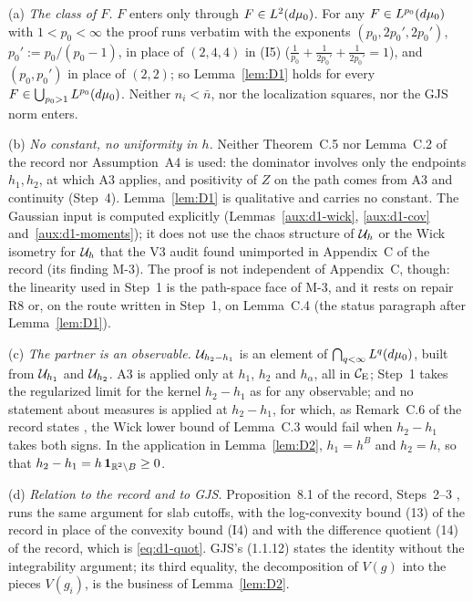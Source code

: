 \begin{auxrem}\label{aux:d1-uses}
(a) \emph{The class of $F$.} $F$ enters only through $F\in L^2(d\mu_0)$. For any
$F\in L^{p_0}(d\mu_0)$ with $1<p_0<\infty$ the proof runs verbatim with the exponents
$(p_0,2p_0',2p_0')$, $p_0':=p_0/(p_0-1)$, in place of $(2,4,4)$ in (I5)
($\frac1{p_0}+\frac1{2p_0'}+\frac1{2p_0'}=1$), and $(p_0,p_0')$ in place of $(2,2)$; so
Lemma~\ref{lem:D1} holds for every $F\in\bigcup_{p_0>1}L^{p_0}(d\mu_0)$. Neither $n_i<\bar n$,
nor the localization squares, nor the GJS norm enters.

(b) \emph{No constant, no uniformity in $h$.} Neither Theorem~C.5 nor Lemma~C.2 of the
record nor Assumption~A4 is used: the dominator involves only the endpoints $h_1,h_2$, at which
A3 applies, and positivity of $Z$ on the path comes from A3 and continuity (Step~4).
Lemma~\ref{lem:D1} is qualitative and carries no constant. The Gaussian input is computed
explicitly (Lemmas~\ref{aux:d1-wick}, \ref{aux:d1-cov} and~\ref{aux:d1-moments}); it does
not use the chaos structure of $\mathcal U_h$ or the Wick isometry for $\mathcal U_h$ that the V3 audit found
unimported in Appendix~C of the record (its finding M-3).  The proof is not independent of
Appendix~C, though: the linearity used in Step~1 is the path-space face of M-3, and it rests on
repair R8 or, on the route written in Step~1, on Lemma~C.4 (the status paragraph after
Lemma~\ref{lem:D1}).

(c) \emph{The partner is an observable.} $\mathcal U_{h_2-h_1}$ is an element of
$\bigcap_{q<\infty}L^q(d\mu_0)$, built from $\mathcal U_{h_1}$ and $\mathcal U_{h_2}$. A3 is applied only at
$h_1$, $h_2$ and $h_\alpha$, all in $\mathcal{C}_{\mathrm E}$; Step~1 takes the regularized limit for the kernel
$h_2-h_1$ as for any observable; and no statement about measures is applied at $h_2-h_1$,
for which, as Remark~C.6 of the record states \cite[p.~41]{R}, the Wick lower bound of
Lemma~C.3 would fail when $h_2-h_1$ takes both signs. In the application in
Lemma~\ref{lem:D2}, $h_1=h^B$ and $h_2=h$, so that $h_2-h_1=h\,\mathbf 1_{\mathbb{R}^2\setminus B}\ge0$.

(d) \emph{Relation to the record and to GJS.} Proposition~8.1 of the record, Steps~2--3
\cite[pp.~24--25]{R}, runs the same argument for slab cutoffs, with the log-convexity bound
(13) of the record in place of the convexity bound (I4) and with the difference quotient (14)
of the record, which is \eqref{eq:d1-quot}. GJS's (1.1.12) states the identity without the
integrability argument; its third equality, the decomposition of $V(g)$ into the pieces
$V(g_i)$, is the business of Lemma~\ref{lem:D2}.
\end{auxrem}

